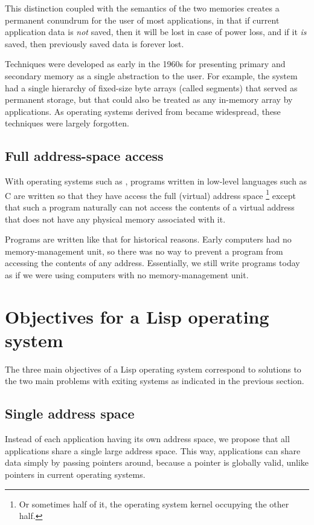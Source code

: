 This distinction coupled with the semantics of the two memories
creates a permanent conundrum for the user of most applications, in
that if current application data is \emph{not} saved, then it will
be lost in case of power loss, and if it \emph{is} saved, then
previously saved data is forever lost. 

Techniques were developed as early in the 1960s for presenting
primary and secondary memory as a single abstraction to the user.
For example, the \multics{} system had a single hierarchy of fixed-size
byte arrays (called segments) that served as permanent storage, but
that could also be treated as any in-memory array by applications.
As operating systems derived from \unix{} became widespread, these
techniques were largely forgotten. 

\subsection{Full address-space access}

With operating systems such as \unix{}, programs written in low-level
languages such as C are written so that they have access the full
(virtual) address space%
\footnote{Or sometimes half of it, the operating system kernel
  occupying the other half.}
except that such a program naturally can not access the contents of a
virtual address that does not have any physical memory associated with
it.

Programs are written like that for historical reasons.  Early
computers had no memory-management unit, so there was no way to
prevent a program from accessing the contents of any address.
Essentially, we still write programs today as if we were using
computers with no memory-management unit.

\section{Objectives for a Lisp operating system}

The three main objectives of a Lisp operating system correspond to
solutions to the two main problems with exiting systems as indicated
in the previous section.

\subsection{Single address space}

Instead of each application having its own address space, we propose
that all applications share a single large address space.  This way,
applications can share data simply by passing pointers around,
because a pointer is globally valid, unlike pointers in current
operating systems. 


